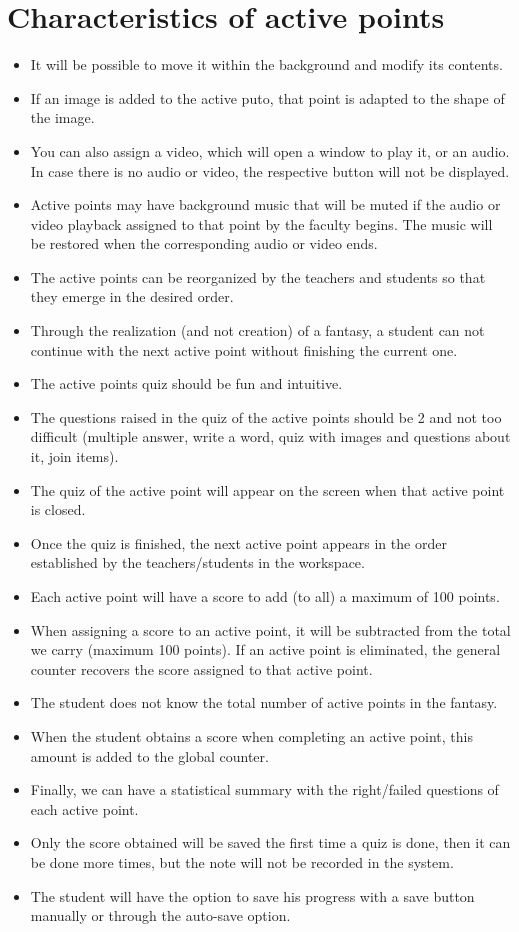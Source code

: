 \section{Characteristics of active points}
\begin{itemize}
	\item It will be possible to move it within the background and modify its contents.
	\item If an image is added to the active puto, that point is adapted to the shape of the image.
	\item You can also assign a video, which will open a window to play it, or an audio. In case there is no audio or video, the respective button will not be displayed.
	\item Active points may have background music that will be muted if the audio or video playback assigned to that point by the faculty begins. The music will be restored when the corresponding audio or video ends.
	\item The active points can be reorganized by the teachers and students so that they emerge in the desired order.
	\item Through the realization (and not creation) of a fantasy, a student can not continue with the next active point without finishing the current one.
	\item The active points quiz should be fun and intuitive.
	\item The questions raised in the quiz of the active points should be 2 and not too difficult (multiple answer, write a word, quiz with images and questions about it, join items).
	\item The quiz of the active point will appear on the screen when that active point is closed.
	\item Once the quiz is finished, the next active point appears in the order established by the teachers/students in the workspace.
	\item Each active point will have a score to add (to all) a maximum of 100 points.
	\item When assigning a score to an active point, it will be subtracted from the total we carry (maximum 100 points). If an active point is eliminated, the general counter recovers the score assigned to that active point.
	\item The student does not know the total number of active points in the fantasy.
	\item When the student obtains a score when completing an active point, this amount is added to the global counter.
	\item Finally, we can have a statistical summary with the right/failed questions of each active point.
	\item Only the score obtained will be saved the first time a quiz is done, then it can be done more times, but the note will not be recorded in the system.
	\item The student will have the option to save his progress with a save button manually or through the auto-save option.
\end{itemize}

